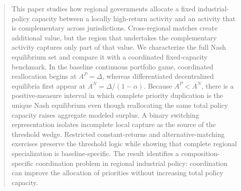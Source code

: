 \begin{abstract}
This paper studies how regional governments allocate a fixed industrial-policy capacity between a locally high-return activity and an activity that is complementary across jurisdictions. Cross-regional matches create additional value, but the region that undertakes the complementary activity captures only part of that value. We characterize the full Nash equilibrium set and compare it with a coordinated fixed-capacity benchmark. In the baseline continuous portfolio game, coordinated reallocation begins at $A^P=\Delta$, whereas differentiated decentralized equilibria first appear at $A^N=\Delta/(1-\alpha)$. Because $A^P<A^N$, there is a positive-measure interval in which complete priority duplication is the unique Nash equilibrium even though reallocating the same total policy capacity raises aggregate modeled surplus. A binary switching representation isolates incomplete local capture as the source of the threshold wedge. Restricted constant-returns and alternative-matching exercises preserve the threshold logic while showing that complete regional specialization is baseline-specific. The result identifies a composition-specific coordination problem in regional industrial policy: coordination can improve the allocation of priorities without increasing total policy capacity.
\end{abstract}
